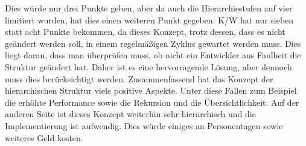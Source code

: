 Dies würde nur drei Punkte geben, aber da auch die Hierarchiestufen auf vier limitiert wurden, hat dies einen weiteren Punkt gegeben.
\ac{K/W} hat nur sieben statt acht Punkte bekommen, da dieses Konzept, trotz dessen, dass es nicht geändert werden soll, in einem regelmäßigen Zyklus gewartet werden muss.
Dies liegt daran, dass man überprüfen muss, ob nicht ein Entwickler aus Faulheit die Struktur geändert hat.
Daher ist es eine hervorragende Lösung, aber dennoch muss dies berücksichtigt werden.
\newline
\newline
Zusammenfassend hat das Konzept der hierarchischen Struktur viele positive Aspekte.
Unter diese Fallen zum Beispiel die erhöhte Performance sowie die Rekursion und die Übersichtlichkeit.
Auf der anderen Seite ist dieses Konzept weiterhin sehr hierarchisch und die Implementierung ist aufwendig.
Dies würde einiges an Personentagen sowie weiteres Geld kosten.


